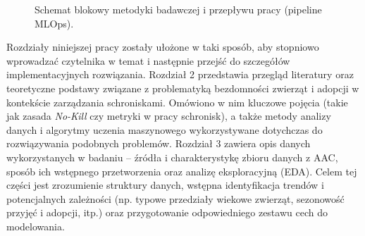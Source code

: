 \begin{figure}[htbp]
\centering
{}
\caption{Schemat blokowy metodyki badawczej i przepływu pracy (pipeline MLOps).}
\label{fig:ml_workflow}
\end{figure}

Rozdziały niniejszej pracy zostały ułożone w taki sposób, aby stopniowo wprowadzać czytelnika w temat i następnie przejść do szczegółów implementacyjnych rozwiązania. Rozdział 2 przedstawia przegląd literatury oraz teoretyczne podstawy związane z problematyką bezdomności zwierząt i adopcji w kontekście zarządzania schroniskami. Omówiono w nim kluczowe pojęcia (takie jak zasada \emph{No-Kill} czy metryki w pracy schronisk), a także metody analizy danych i algorytmy uczenia maszynowego wykorzystywane dotychczas do rozwiązywania podobnych problemów. Rozdział 3 zawiera opis danych wykorzystanych w badaniu – źródła i charakterystykę zbioru danych z AAC, sposób ich wstępnego przetworzenia oraz analizę eksploracyjną (EDA). Celem tej części jest zrozumienie struktury danych, wstępna identyfikacja trendów i potencjalnych zależności (np. typowe przedziały wiekowe zwierząt, sezonowość przyjęć i adopcji, itp.) oraz przygotowanie odpowiedniego zestawu cech do modelowania.

